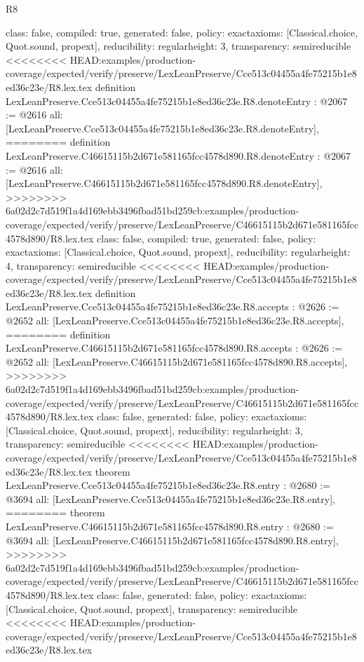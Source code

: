 \begin{lexlean}{R8}
\begin{coremodule}
{{{{{{{{{{{{{{{{{{{{{{{{{{{{{{{{{{{{  class: false,
  compiled: true,
  generated: false,
  policy: exact{axioms: [Classical.choice, Quot.sound, propext]},
  reducibility: regular{height: 3},
  transparency: semireducible
}
<<<<<<<< HEAD:examples/production-coverage/expected/verify/preserve/LexLeanPreserve/Cce513c04455a4fe75215b1e8ed36c23e/R8.lex.tex
definition LexLeanPreserve.Cce513c04455a4fe75215b1e8ed36c23e.R8.denoteEntry : @2067 := @2616 {
  all: [LexLeanPreserve.Cce513c04455a4fe75215b1e8ed36c23e.R8.denoteEntry],
========
definition LexLeanPreserve.C46615115b2d671e581165fcc4578d890.R8.denoteEntry : @2067 := @2616 {
  all: [LexLeanPreserve.C46615115b2d671e581165fcc4578d890.R8.denoteEntry],
>>>>>>>> 6a02d2c7d519f1a4d169ebb3496fbad51bd259cb:examples/production-coverage/expected/verify/preserve/LexLeanPreserve/C46615115b2d671e581165fcc4578d890/R8.lex.tex
  class: false,
  compiled: true,
  generated: false,
  policy: exact{axioms: [Classical.choice, Quot.sound, propext]},
  reducibility: regular{height: 4},
  transparency: semireducible
}
<<<<<<<< HEAD:examples/production-coverage/expected/verify/preserve/LexLeanPreserve/Cce513c04455a4fe75215b1e8ed36c23e/R8.lex.tex
definition LexLeanPreserve.Cce513c04455a4fe75215b1e8ed36c23e.R8.accepts : @2626 := @2652 {
  all: [LexLeanPreserve.Cce513c04455a4fe75215b1e8ed36c23e.R8.accepts],
========
definition LexLeanPreserve.C46615115b2d671e581165fcc4578d890.R8.accepts : @2626 := @2652 {
  all: [LexLeanPreserve.C46615115b2d671e581165fcc4578d890.R8.accepts],
>>>>>>>> 6a02d2c7d519f1a4d169ebb3496fbad51bd259cb:examples/production-coverage/expected/verify/preserve/LexLeanPreserve/C46615115b2d671e581165fcc4578d890/R8.lex.tex
  class: false,
  generated: false,
  policy: exact{axioms: [Classical.choice, Quot.sound, propext]},
  reducibility: regular{height: 3},
  transparency: semireducible
}
<<<<<<<< HEAD:examples/production-coverage/expected/verify/preserve/LexLeanPreserve/Cce513c04455a4fe75215b1e8ed36c23e/R8.lex.tex
theorem LexLeanPreserve.Cce513c04455a4fe75215b1e8ed36c23e.R8.entry : @2680 := @3694 {
  all: [LexLeanPreserve.Cce513c04455a4fe75215b1e8ed36c23e.R8.entry],
========
theorem LexLeanPreserve.C46615115b2d671e581165fcc4578d890.R8.entry : @2680 := @3694 {
  all: [LexLeanPreserve.C46615115b2d671e581165fcc4578d890.R8.entry],
>>>>>>>> 6a02d2c7d519f1a4d169ebb3496fbad51bd259cb:examples/production-coverage/expected/verify/preserve/LexLeanPreserve/C46615115b2d671e581165fcc4578d890/R8.lex.tex
  class: false,
  generated: false,
  policy: exact{axioms: [Classical.choice, Quot.sound, propext]},
  transparency: semireducible
}
<<<<<<<< HEAD:examples/production-coverage/expected/verify/preserve/LexLeanPreserve/Cce513c04455a4fe75215b1e8ed36c23e/R8.lex.tex
}}}}}}}}}}}}}}}}}}}}}}}}}}}}}}}}}}}}}}
\end{coremodule}
\end{lexlean}
